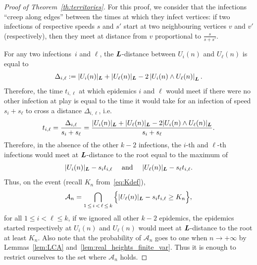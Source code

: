 \documentclass[10pt]{amsart}
\theoremstyle{definition}\newtheorem{defi}[theo]{Definition}\newtheorem{rema}[theo]{Remark}\newtheorem{exam}[theo]{Example}\newtheorem{exem}[theo]{Example}\newtheorem{nota}[theo]{Notation}
\newcommand{\bs}{\ensuremath{\boldsymbol}}
\newcommand{\clA}{\mathcal{A}}
\begin{document}
\begin{proof}[Proof of Theorem~\ref{th:territories}]
For this proof, we consider that the infections ``creep along edges'' between the times at which they infect vertices: if two infections of respective speeds $s$ and $s'$ start at two neighbouring vertices $v$ and $v'$ (respectively), then they meet at distance from $v$ proportional to $\frac s{s+s'}$.

For any two infections~$i$ and $\ell$, the $\bs L$-distance between $U_i(n)$ and $U_\ell(n)$ is equal to
\[
\Delta_{i,\ell} := |U_i(n)|_{\bs L}+|U_\ell(n)|_{\bs L}-2\left|U_i(n)\wedge U_\ell(n)\right|_{\bs L}.
\]
Therefore, the time $t_{i,\ell}$ at which epidemics $i$ and $\ell$ would meet if there were no other infection at play is equal to the time it would take for an infection of speed $s_i+s_\ell$ to cross a distance $\Delta_{i,\ell}$, i.e.
\begin{equation}\label{eq:til}
t_{i,\ell} = \frac{\Delta_{i,\ell}}{s_i+s_\ell} = \frac{|U_i(n)|_{\bs L}+|U_\ell(n)|_{\bs L}-2|U_i(n)\wedge U_\ell(n)|_{\bs L}}{s_i+s_\ell}.
\end{equation}
Therefore, in the absence of the other $k-2$ infections, the $i$-th and $\ell$-th infections would meet at $\bs L$-distance to the root equal to the maximum of
\begin{equation}\label{eq:meeting}
|U_i(n)|_{\bs L} - s_i t_{i,\ell} \quad\text{ and }\quad |U_\ell(n)|_{\bs L} - s_\ell t_{i,\ell}.
\end{equation}
Thus, on the event (recall $K_n$ from~\eqref{eq:Kdef}),
\[
\clA_n = \bigcap_{1\,\leq\,i\,<\,\ell\,\leq\,k}\Big\{|U_\ell(n)|_{\bs L} - s_i t_{i,\ell}\geq K_n\Big\},
\]
for all $1\leq i<\ell\leq k$, if we ignored all other $k-2$ epidemics, the epidemics started respectively at $U_i(n)$ and $U_\ell(n)$ would meet at $\bs L$-distance to the root at least $K_n$. Also note that the probability of $\clA_n$ goes to one when $n\to+\infty$ by Lemmas~\ref{lem:LCA} and~\ref{lem:real_heights_finite_var}. Thus it is enough to restrict ourselves to the set where $\clA_n$ holds.



\end{proof}
\end{document}
